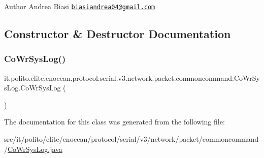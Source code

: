 \begin{DoxyAuthor}{Author}
Andrea Biasi \href{mailto:biasiandrea04@gmail.com}{\tt biasiandrea04@gmail.\+com} 
\end{DoxyAuthor}


\subsection{Constructor \& Destructor Documentation}
\hypertarget{classit_1_1polito_1_1elite_1_1enocean_1_1protocol_1_1serial_1_1v3_1_1network_1_1packet_1_1commoncommand_1_1_co_wr_sys_log_a450d9e0ddb62c5766bbcd1be27ea032b}{}\label{classit_1_1polito_1_1elite_1_1enocean_1_1protocol_1_1serial_1_1v3_1_1network_1_1packet_1_1commoncommand_1_1_co_wr_sys_log_a450d9e0ddb62c5766bbcd1be27ea032b} 
\subsubsection{\texorpdfstring{Co\+Wr\+Sys\+Log()}{CoWrSysLog()}}
{\footnotesize\ttfamily it.\+polito.\+elite.\+enocean.\+protocol.\+serial.\+v3.\+network.\+packet.\+commoncommand.\+Co\+Wr\+Sys\+Log.\+Co\+Wr\+Sys\+Log (\begin{DoxyParamCaption}{ }\end{DoxyParamCaption})}



The documentation for this class was generated from the following file\+:\begin{DoxyCompactItemize}
\item 
src/it/polito/elite/enocean/protocol/serial/v3/network/packet/commoncommand/\hyperlink{_co_wr_sys_log_8java}{Co\+Wr\+Sys\+Log.\+java}\end{DoxyCompactItemize}
